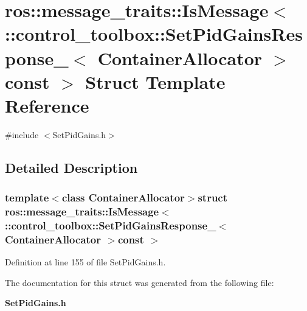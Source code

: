 \section{ros\-:\-:message\-\_\-traits\-:\-:\-Is\-Message$<$ \-:\-:control\-\_\-toolbox\-:\-:\-Set\-Pid\-Gains\-Response\-\_\-$<$ \-Container\-Allocator $>$const $>$ \-Struct \-Template \-Reference}
\label{structros_1_1message__traits_1_1IsMessage_3_01_1_1control__toolbox_1_1SetPidGainsResponse___3_01dda446162699ffdcef934adab0fbd9d8}


{\ttfamily \#include $<$\-Set\-Pid\-Gains.\-h$>$}



\subsection{\-Detailed \-Description}
\subsubsection*{template$<$class Container\-Allocator$>$struct ros\-::message\-\_\-traits\-::\-Is\-Message$<$ \-::control\-\_\-toolbox\-::\-Set\-Pid\-Gains\-Response\-\_\-$<$ Container\-Allocator $>$const  $>$}



\-Definition at line 155 of file \-Set\-Pid\-Gains.\-h.



\-The documentation for this struct was generated from the following file\-:\begin{DoxyCompactItemize}
\item 
{\bf \-Set\-Pid\-Gains.\-h}\end{DoxyCompactItemize}
